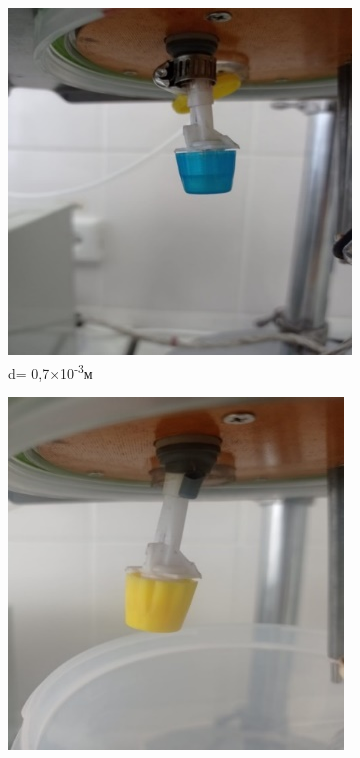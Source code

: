 \begin{figure}[H]
	\centering
	\begin{subfigure}[b]{0.32\textwidth}
		\centering
		\includegraphics[width=\textwidth,height=\textwidth]{media/pish/image20}
		\caption*{d= 0,7×10\textsuperscript{-3}м}
	\end{subfigure}
	\hfill
	\begin{subfigure}[b]{0.32\textwidth}
		\centering
		\includegraphics[width=\textwidth,height=\textwidth]{media/pish/image21}

\end{subfigure}
\end{figure}

